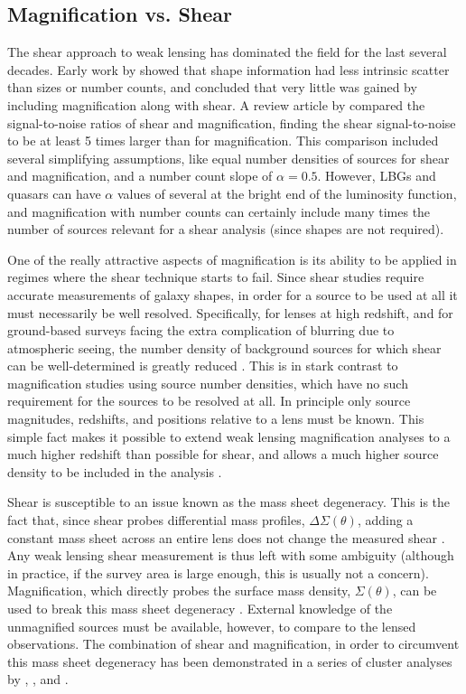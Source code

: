 \subsection{Magnification vs. Shear}
\label{sec:VS}

The shear approach to weak lensing has dominated the field for the last several decades. Early work by \citet{Schneider00} showed that shape information had less intrinsic scatter than sizes or number counts, and concluded that very little was gained by including magnification along with shear. A review article by \citet{BS01} compared the signal-to-noise ratios of shear and magnification, finding the shear signal-to-noise to be at least 5 times larger than for magnification. This comparison included several simplifying assumptions, like equal number densities of sources for shear and magnification, and a number count slope of $\alpha=0.5$. However, \ac{LBG}s and quasars can have $\alpha$ values of several at the bright end of the luminosity function, and magnification with number counts can certainly include many times the number of sources relevant for a shear analysis (since shapes are not required).

One of the really attractive aspects of magnification is its ability to be applied in regimes where the shear technique starts to fail. Since shear studies require accurate measurements of galaxy shapes, in order for a source to be used at all it must necessarily be well resolved. Specifically, for lenses at high redshift, and for ground-based surveys facing the extra complication of blurring due to atmospheric seeing, the number density of background sources for which shear can be well-determined is greatly reduced \citep{Waerbeke10}.  This is in stark contrast to magnification studies using source number densities, which have no such requirement for the sources to be resolved at all.  In principle only source magnitudes, redshifts, and positions relative to a lens must be known.  This simple fact makes it possible to extend weak lensing magnification analyses to a much higher redshift than possible for shear, and allows a much higher source density to be included in the analysis \citep{LHJM10}.  

Shear is susceptible to an issue known as the mass sheet degeneracy. This is the fact that, since shear probes differential mass profiles, $\Delta\Sigma(\theta)$, adding a constant mass sheet across an entire lens does not change the measured shear \citep{Falco85,SchneiderSeitz95}. Any weak lensing shear measurement is thus left with some ambiguity (although in practice, if the survey area is large enough, this is usually not a concern). Magnification, which directly probes the surface mass density, $\Sigma(\theta)$, can be used to break this mass sheet degeneracy  \citep{Broadhurst95}. External knowledge of the unmagnified sources must be available, however, to compare to the lensed observations. The combination of shear and magnification, in order to circumvent this mass sheet degeneracy has been demonstrated in a series of cluster analyses by \citet{Umetsu11}, \citet{Umetsu13}, and \citet{Umetsu14}.

